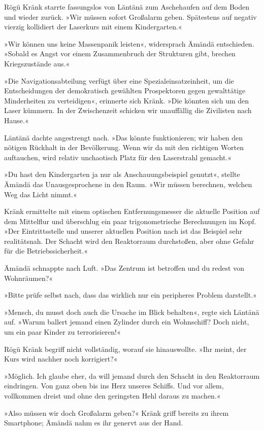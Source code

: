 Rögü Kränk starrte fassungslos von Läntänä zum Aschehaufen auf dem Boden und wieder zurück. »Wir müssen sofort Großalarm geben. Spätestens auf negativ vierzig kollidiert der Laserkurs mit einem Kindergarten.«

»Wir können uns keine Massenpanik leisten«, widersprach Ämändä entschieden. »Sobald es Angst vor einem Zusammenbruch der Strukturen gibt, brechen Kriegszustände aus.«

»Die Navigationsabteilung verfügt über eine Spezialeinsatzeinheit, um die Entscheidungen der demokratisch gewählten Prospektoren gegen gewalttätige Minderheiten zu verteidigen«, erinnerte sich Kränk. »Die könnten sich um den Laser kümmern. In der Zwischenzeit schicken wir unauffällig die Zivilisten nach Hause.«

Läntänä dachte angestrengt nach. »Das könnte funktionieren; wir haben den nötigen Rückhalt in der Bevölkerung. Wenn wir da mit den richtigen Worten auftauchen, wird relativ unchaotisch Platz für den Laserstrahl gemacht.«

»Du hast den Kindergarten ja nur als Anschauungsbeispiel genutzt«, stellte Ämändä das Unausgesprochene in den Raum. »Wir müssen berechnen, welchen Weg das Licht nimmt.«

Kränk ermittelte mit einem optischen Entfernungsmesser die aktuelle Position auf dem Mittelflur und überschlug ein paar trigonometrische Berechnungen im Kopf. »Der Eintrittsstelle und unserer aktuellen Position nach ist das Beispiel sehr realitätsnah. Der Schacht wird den Reaktorraum durchstoßen, aber ohne Gefahr für die Betriebssicherheit.«

Ämändä schnappte nach Luft. »Das Zentrum ist betroffen und du redest von Wohnräumen?«

»Bitte prüfe selbst nach, dass das wirklich nur ein peripheres Problem darstellt.«

»Mensch, du musst doch auch die Ursache im Blick behalten«, regte sich Läntänä auf. »Warum ballert jemand einen Zylinder durch ein Wohnschiff? Doch nicht, um ein paar Kinder zu terrorisieren!«

Rögü Kränk begriff nicht vollständig, worauf sie hinauswollte. »Ihr meint, der Kurs wird nachher noch korrigiert?«

»Möglich. Ich glaube eher, da will jemand durch den Schacht in den Reaktorraum eindringen. Von ganz oben bis ins Herz unseres Schiffs. Und vor allem, vollkommen dreist und ohne den geringsten Hehl daraus zu machen.«

»Also müssen wir doch Großalarm geben?« Kränk griff bereits zu ihrem Smartphone; Ämändä nahm es ihr genervt aus der Hand.

